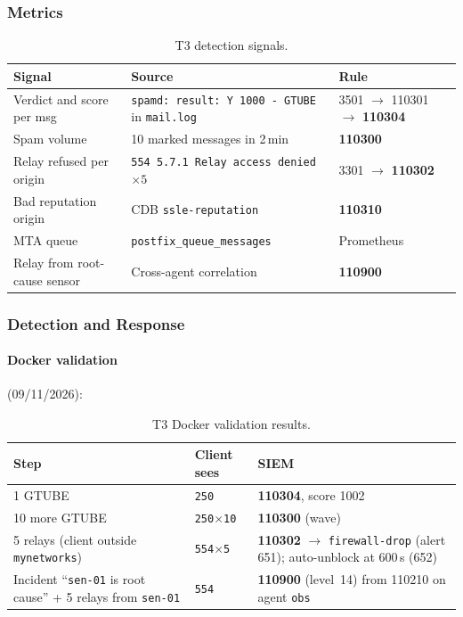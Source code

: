 \documentclass[11pt,a4paper]{article}
\begin{document}
\subsubsection{Metrics}

\begin{table}[H]
  \centering
  \caption{T3 detection signals.}
  \begin{tabular}{@{}p{3cm}p{4.5cm}l@{}}
    \toprule
    \textbf{Signal} & \textbf{Source} & \textbf{Rule} \\
    \midrule
    Verdict and score per msg & \texttt{spamd: result: Y 1000 - GTUBE} in \texttt{mail.log} &
      3501 $\to$ 110301 $\to$ \textbf{110304} \\
    Spam volume & 10 marked messages in 2\,min &
      \textbf{110300} \\
    Relay refused per origin & \texttt{554 5.7.1 Relay access denied} $\times 5$ &
      3301 $\to$ \textbf{110302} \\
    Bad reputation origin & CDB \texttt{ssle-reputation} &
      \textbf{110310} \\
    MTA queue & \texttt{postfix\_queue\_messages} &
      Prometheus \\
    Relay from root-cause sensor & Cross-agent correlation &
      \textbf{110900} \\
    \bottomrule
  \end{tabular}
\end{table}

\subsubsection{Detection and Response}

\paragraph{Docker validation} (09/11/2026):

\begin{table}[H]
  \centering
  \caption{T3 Docker validation results.}
  \begin{tabular}{@{}p{4cm}lp{6cm}@{}}
    \toprule
    \textbf{Step} & \textbf{Client sees} & \textbf{SIEM} \\
    \midrule
    1 GTUBE & \texttt{250} &
      \textbf{110304}, score 1002 \\
    10 more GTUBE & \texttt{250$\times$10} &
      \textbf{110300} (wave) \\
    5 relays (client outside \texttt{mynetworks}) & \texttt{554$\times$5} &
      \textbf{110302} $\to$ \texttt{firewall-drop} (alert 651); auto-unblock at 600\,s (652) \\
    Incident ``\texttt{sen-01} is root cause'' + 5 relays from \texttt{sen-01} & \texttt{554} &
      \textbf{110900} (level~14) from 110210 on agent \texttt{obs} \\
    \bottomrule
  \end{tabular}
\end{table}
\end{document}
